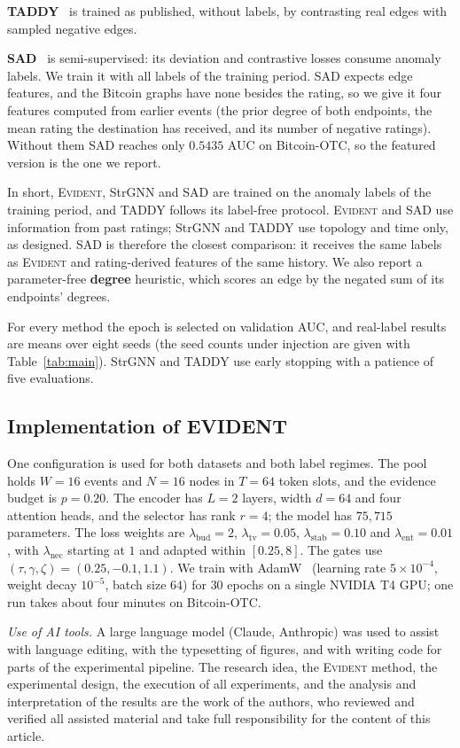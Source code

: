 \documentclass[pdflatex,sn-basic]{sn-jnl}
\newcommand{\evident}{\textsc{Evident}}
\theoremstyle{definition}
\theoremstyle{plain}
\begin{document}
\textbf{TADDY}~\cite{taddy} is trained as published, without labels, by
contrasting real edges with sampled negative edges.

\textbf{SAD}~\cite{sad} is semi-supervised: its deviation and contrastive
losses consume anomaly labels. We train it with all labels of the training
period. SAD expects edge features, and the Bitcoin graphs have none besides
the rating, so we give it four features computed from earlier events (the
prior degree of both endpoints, the mean rating the destination has received,
and its number of negative ratings). Without them SAD reaches only $0.5435$
AUC on Bitcoin-OTC, so the featured version is the one we report.

In short, \evident{}, StrGNN and SAD are trained on the anomaly labels of the
training period, and TADDY follows its label-free protocol. \evident{} and SAD
use information from past ratings; StrGNN and TADDY use topology and time only,
as designed. SAD is therefore the closest comparison: it receives the same labels as
\evident{} and rating-derived features of the same history. We also
report a parameter-free \textbf{degree} heuristic, which scores an edge by the
negated sum of its endpoints' degrees.

For every method the epoch is selected on validation AUC, and real-label
results are means over eight seeds (the seed counts under injection are given
with Table~\ref{tab:main}). StrGNN and TADDY use early stopping with a patience of
five evaluations.

\subsection{Implementation of EVIDENT}
One configuration is used for both datasets and both label regimes. The pool
holds $W=16$ events and $N=16$ nodes in $T=64$ token slots, and the evidence
budget is $p=0.20$. The encoder has $L=2$ layers, width $d=64$ and four
attention heads, and the selector has rank $r=4$; the model has $75{,}715$
parameters. The loss weights are $\lambda_{\text{bud}}=2$,
$\lambda_{\text{tv}}=0.05$, $\lambda_{\text{stab}}=0.10$ and
$\lambda_{\text{ent}}=0.01$, with $\lambda_{\text{nec}}$ starting at $1$ and
adapted within $[0.25,8]$. The gates use $(\tau,\gamma,\zeta)=(0.25,-0.1,1.1)$.
We train with AdamW~\cite{adamw} (learning rate $5\times10^{-4}$, weight decay
$10^{-5}$, batch size $64$) for $30$ epochs on a single NVIDIA T4 GPU; one run
takes about four minutes on Bitcoin-OTC.

\emph{Use of AI tools.} A large language model (Claude, Anthropic) was used to
assist with language editing, with the typesetting of figures, and with
writing code for parts of the experimental pipeline. The research idea, the
\evident{} method, the experimental design, the execution of all experiments,
and the analysis and interpretation of the results are the work of the
authors, who reviewed and verified all assisted material and take full
responsibility for the content of this article.
\end{document}
